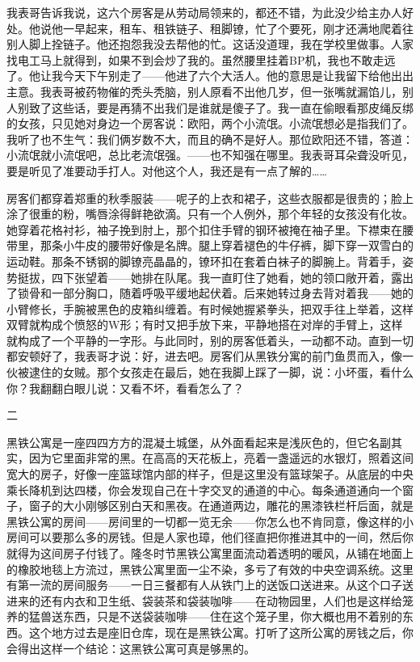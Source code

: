 我表哥告诉我说，这六个房客是从劳动局领来的，都还不错，为此没少给主办人好处。他说他一早起来，租车、租铁链子、租脚镣，忙了个要死，刚才还满地爬着往别人脚上拴链子。他还抱怨我没去帮他的忙。这话没道理，我在学校里做事。人家找电工马上就得到，如果不到会炒了我的。虽然腰里挂着BP机，我也不敢走远了。他让我今天下午别走了——他进了六个大活人。他的意思是让我留下给他出出主意。我表哥被药物催的秃头秃脑，别人原看不出他几岁，但一张嘴就漏馅儿，别人别致了这些话，要是再猜不出我们是谁就是傻子了。我一直在偷眼看那皮绳反绑的女孩，只见她对身边一个房客说：欧阳，两个小流氓。小流氓想必是指我们了。我听了也不生气：我们俩岁数不大，而且的确不是好人。那位欧阳还不错，答道：小流氓就小流氓吧，总比老流氓强。——也不知强在哪里。我表哥耳朵聋没听见，要是听见了准要动手打人。对他这个人，我还是有一点了解的…… 

房客们都穿着郑重的秋季服装——呢子的上衣和裙子，这些衣服都是很贵的；脸上涂了很重的粉，嘴唇涂得鲜艳欲滴。只有一个人例外，那个年轻的女孩没有化妆。她穿着花格衬衫，袖子挽到肘上，那个扣住手臂的钢环被掩在袖子里。下襟束在腰带里，那条小牛皮的腰带好像是名牌。腿上穿着褪色的牛仔裤，脚下穿一双雪白的运动鞋。那条不锈钢的脚镣亮晶晶的，镣环扣在套着白袜子的脚腕上。背着手，姿势挺拔，四下张望着——她排在队尾。我一直盯住了她看，她的领口敞开着，露出了锁骨和一部分胸口，随着呼吸平缓地起伏着。后来她转过身去背对着我——她的小臂修长，手腕被黑色的皮箱纠缠着。有时候她握紧拳头，把双手往上举着，这样双臂就构成个愤怒的W形；有时又把手放下来，平静地搭在对岸的手臂上，这样就构成了一个平静的一字形。与此同时，别的房客低着头，一动都不动。直到一切都安顿好了，我表哥才说：好，进去吧。房客们从黑铁分寓的前门鱼贯而入，像一伙被逮住的女贼。那个女孩走在最后，她在我脚上踩了一脚，说：小坏蛋，看什么你？我翻翻白眼儿说：又看不坏，看看怎么了？ 



二 

黑铁公寓是一座四四方方的混凝土城堡，从外面看起来是浅灰色的，但它名副其实，因为它里面非常的黑。在高高的天花板上，亮着一盏遥远的水银灯，照着这间宽大的房子，好像一座篮球馆内部的样子，但是这里没有篮球架子。从底层的中央乘长降机到达四楼，你会发现自己在十字交叉的通道的中心。每条通道通向一个窗子，窗子的大小刚够区别白天和黑夜。在通道两边，雕花的黑漆铁栏杆后面，就是黑铁公寓的房间——房间里的一切都一览无余——你怎么也不肯同意，像这样的小房间可以要那么多的房钱。但是人家也璋，他们径直把你推进其中的一间，然后你就得为这间房子付钱了。隆冬时节黑铁公寓里面流动着透明的暖风，从铺在地面上的橡胶地毯上方流过，黑铁公寓里面一尘不染，多亏了有效的中央空调系统。这里有第一流的房间服务——一日三餐都有人从铁门上的送饭口送进来。从这个口子送进来的还有内衣和卫生纸、袋装茶和袋装咖啡——在动物园里，人们也是这样给笼养的猛兽送东西，只是不送袋装咖啡——住在这个笼子里，你大概也用不着别的东西。这个地方过去是座旧仓库，现在是黑铁公寓。打听了这所公寓的房钱之后，你会得出这样一个结论：这黑铁公寓可真是够黑的。 

